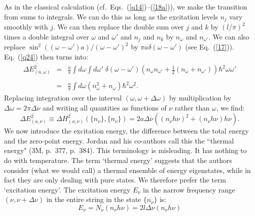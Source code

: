 \documentclass{elsart}
\begin{document}
As in the classical calculation (cf.\ Eqs.\ (\ref{q14})--(\ref{18a})), we  make the transition from sums to integrals. We can do this as long as the excitation levels $n_j$ vary smoothly with $j$. We can then replace the double sum over $j$ and $k$ by $(l/\pi)^2$ times a double integral over $\omega$ and $\omega'$ and $n_j$ and $n_k$ by $n_\omega$ and $n_{\omega'}$. We can also replace $\sin^2{((\omega - \omega')a)}/(\omega - \omega')^2$ by $\pi a \delta(\omega - \omega')$ (see Eq.\ (\ref{17})). Eq.\ (\ref{q24}) then turns into:
\begin{eqnarray}
\overline{\Delta E_{(a, \omega)}^2}
& = &
\frac{a}{\pi} \int d\omega \int d\omega' \; \delta(\omega - \omega')
 \left(  n_\omega n_{\omega'} + \frac{1}{2} \left( n_\omega  + n_{\omega'} \right) \right) \hbar^2 \omega \omega'  \nonumber \\
 & & \label{q21a} \\
 & = & \frac{a}{\pi} \int d\omega \left(  n_\omega^2 + n_\omega  \right) \hbar^2 \omega^2.  \nonumber
 \end{eqnarray}
Replacing integration over the interval $(\omega, \omega + \Delta \omega)$ by multiplication by $\Delta \omega = 2 \pi \Delta \nu$ and writing all quantities as functions of $\nu$ rather than $\omega$, we find:
\begin{equation}
\overline{\Delta E_{(a, \nu)}^2}  \equiv \overline{\Delta H_{(a, \nu)}^2}(\{ n_\nu \}, \{ n_\nu \}) = 2a \Delta \nu \left( (n_\nu h \nu)^2 +  (n_\nu h \nu) h \nu \right).
 \label{q21b}
\end{equation}
We now introduce the 
excitation energy, the difference between the total energy and the zero-point energy. Jordan and his co-authors call this  the ``thermal energy"  (3M, p.\ 377, p.\ 384). This terminology is misleading. It has nothing to do with temperature. The term `thermal energy' suggests  that the authors consider (what we would call) a thermal ensemble of energy eigenstates, while in fact they are only dealing with pure states. We therefore prefer the term `excitation energy'. The excitation energy $E_\nu$ in the narrow frequency range $(\nu, \nu + \Delta \nu)$ in the entire string in the state $\{ n_\nu \}$ is:
\begin{equation}
E_\nu = N_\nu (n_\nu  h \nu)  = 2 l \Delta \nu (n_\nu h \nu)
\end{equation}
\end{document}
